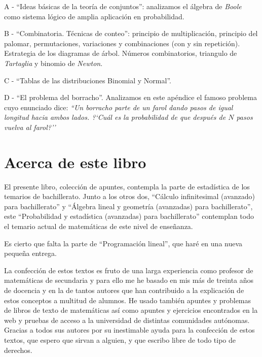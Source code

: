 \begin{adjustwidth}{50pt}{25pt}
A - ``Ideas básicas de la teoría de conjuntos'': analizamos el álgebra de \emph{Boole} como sistema lógico de amplia aplicación en probabilidad.

B - ``Combinatoria. Técnicas de conteo'': principio de multiplicación, principio del palomar, permutaciones, variaciones y combinaciones (con y sin repetición). Estrategia de los diagramas de árbol. Números combinatorios, triangulo de \emph{Tartaglia} y binomio de \emph{Newton}.

C - ``Tablas de las distribuciones Binomial y Normal''.

D - ``El problema del borracho''. Analizamos en este apéndice el famoso problema cuyo enunciado dice: \emph{
``Un borracho parte de un farol dando pasos de igual longitud hacia ambos lados. ?`Cuál es la probabilidad de que después de $N$ pasos vuelva al farol?''
}
\end{adjustwidth}






\section{Acerca de este libro}

El presente libro, colección de apuntes, contempla la parte de estadística de los temarios de bachillerato. Junto a los otros dos, ``Cálculo infinitesimal (avanzado) para bachillerato'' y ``Álgebra lineal y geometría (avanzadas) para bachillerato'', este ``Probabilidad y estadística (avanzadas) para bachillerato'' contemplan todo el temario actual de matemáticas de este nivel de enseñanza.

Es cierto que falta la parte de ``Programación lineal'', que haré en una nueva pequeña entrega.

La confección de estos textos es fruto de una larga experiencia como profesor de matemáticas de secundaria y para ello me he basado en mis más de treinta años de docencia  y en la de tantos autores que han contribuido a la explicación de estos conceptos a multitud de alumnos. He usado también apuntes y problemas de libros de texto de matemáticas así como apuntes y ejercicios encontrados en la web y pruebas de acceso a la universidad de distintas comunidades autónomas. Gracias a todos sus autores por su inestimable ayuda para la confección de estos textos, que espero que sirvan a alguien, y que escribo libre de todo tipo de derechos. 

